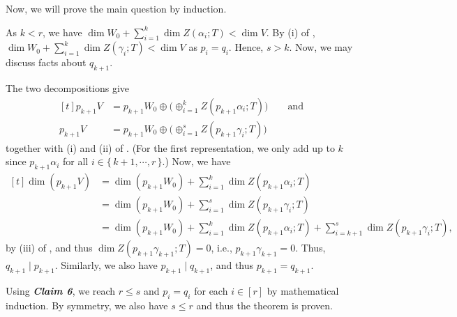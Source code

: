\documentclass[MAS212_Note.tex]{subfiles}
\begin{document}
{    Now, we will prove the main question by induction.

    As \(k < r\),
    we have \(\dim W_0 + \sum_{i=1}^k \dim Z(\alpha_i; T) < \dim V\).
    By (i) of , \(\dim W_0 + \sum_{i=1}^k \dim Z(\gamma_i; T) < \dim V\) as \(p_i = q_i\).
    Hence, \(s > k\). Now, we may discuss facts about \(q_{k+1}\).

    The two decompositions give
    \[\begin{aligned}[t]
        p_{k+1}V &= p_{k+1}W_0 \oplus \big(\oplus_{i=1}^k Z(p_{k+1} \alpha_i; T)\big) \qquad\text{and}\\
        p_{k+1}V &= p_{k+1}W_0 \oplus \big(\oplus_{i=1}^s Z(p_{k+1} \gamma_i; T)\big)
    \end{aligned}\]
    together with (i) and (ii) of .
    (For the first representation, we only add up to \(k\) since \(p_{k+1} \alpha_i\)
    for all \(i \in \{\,k+1,\cdots,r\,\}\).)
    Now, we have
    \[\begin{aligned}[t]
        \dim (p_{k+1}V) &= \textstyle \dim (p_{k+1}W_0) + \sum_{i=1}^k \dim Z(p_{k+1} \alpha_i; T) \\
                        &= \textstyle \dim (p_{k+1}W_0) + \sum_{i=1}^s \dim Z(p_{k+1} \gamma_i; T) \\
                        &= \textstyle \dim (p_{k+1}W_0) + \sum_{i=1}^k \dim Z(p_{k+1} \alpha_i; T) + \sum_{i=k+1}^{s} \dim Z(p_{k+1} \gamma_i; T),
    \end{aligned}\]
    by (iii) of , and thus
    \(\dim Z(p_{k+1} \gamma_{k+1}; T) = 0\), i.e., \(p_{k+1} \gamma_{k+1} = 0\).
    Thus, \(q_{k+1} \mid p_{k+1}\).
    Similarly, we also have \(p_{k+1} \mid q_{k+1}\), and thus \(p_{k+1} = q_{k+1}\). \checkmark

    Using \textbf{\textit{Claim 6}}, we reach \(r \le s\) and \(p_i = q_i\) for each \(i \in [r]\)
    by mathematical induction.
    By symmetry, we also have \(s \le r\) and thus the theorem is proven.
}

\end{document}
